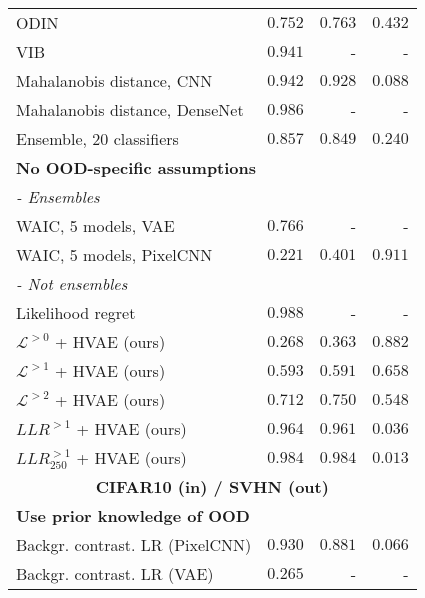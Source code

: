 {\begin{table}[t!]
{\begin{tabular}{lrrr}
ODIN {\parencite{ren_likelihood_2019, liang_enhancing_2018}}                                       & $0.752$ & $0.763$ & $0.432$ \\
VIB \parencite{alemi_uncertainty_2018, choi_waic_2019}                                          & $0.941$ & - & - \\
Mahalanobis distance, CNN {\parencite{ren_likelihood_2019}}                     & $0.942$ & $0.928$ & $0.088$ \\
Mahalanobis distance, DenseNet {\parencite{lee_simple_2018}}                & $0.986$ & - & - \\
Ensemble, 20 classiﬁers {\parencite{ren_likelihood_2019, lakshminarayanan_simple_2017}}                  & $0.857$ & $0.849$ & $0.240$ \\
         \multicolumn{4}{l}{\textbf{No OOD-specific assumptions}} \\
         \multicolumn{4}{l}{\textit{- Ensembles}} \\
WAIC, 5 models, VAE {\parencite{choi_waic_2019}}                          & $0.766$ & - & - \\
WAIC, 5 models, PixelCNN {\parencite{ren_likelihood_2019}}                      & $0.221$ & $0.401$ & $0.911$ \\
        \multicolumn{4}{l}{\textit{- Not ensembles}} \\
Likelihood regret \parencite{xiao_likelihood_2020}                               & $\mathbf{0.988}$ & - & - \\
$\mathcal{L}^{>0}$ + HVAE (ours)                    & $0.268$ & $0.363$ & $0.882$ \\
$\mathcal{L}^{>1}$ + HVAE (ours)                    & $0.593$ & $0.591$ & $0.658$ \\
$\mathcal{L}^{>2}$ + HVAE (ours)                    & $0.712$ & $0.750$ & $0.548$ \\
$LLR^{>1}$ + HVAE (ours)                            & $0.964$ & $0.961$ & $0.036$ \\
$LLR^{>1}_{250}$ + HVAE (ours)                      & $0.984$ & $\mathbf{0.984}$ & $\mathbf{0.013}$ \\
         \midrule
         \multicolumn{4}{c}{\textbf{CIFAR10 (in) / SVHN (out)}} \\
         \midrule
         \multicolumn{4}{l}{\textbf{Use prior knowledge of OOD}} \\
Backgr. contrast. LR (PixelCNN) {\parencite{ren_likelihood_2019}}               & $0.930$ & $0.881$ & $0.066$ \\
Backgr. contrast. LR (VAE) {\parencite{xiao_likelihood_2020}}                    & $0.265$ & - & - \\

\end{tabular}}
\end{table}}
